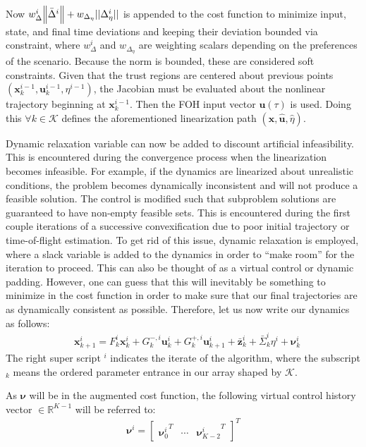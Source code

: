 \documentclass[conf]{new-aiaa}
\begin{document}
Now $w_\Delta^i \norm{{\bar{\Delta}}^i} + w_{\Delta_\eta} ||\Delta_\eta^i ||$ is appended to the cost function to minimize input, state, and final time deviations and keeping their deviation bounded via constraint, where $w_\Delta^i$ and $w_{\Delta_\eta}$ are weighting scalars depending on the preferences of the scenario. Because the norm is bounded, these are considered soft constraints. Given that the trust regions are centered about previous points $(\mathbf{x}_{k}^{i-1},\mathbf{u}_{k}^{i-1},\eta^{i-1})$, the Jacobian must be evaluated about the nonlinear trajectory beginning at $\mathbf{x}_{k}^{i-1}$. Then the FOH input vector $\mathbf{u}(\tau)$ is used. Doing this $\forall k \in \mathcal{K}$ defines the aforementioned linearization path $(\hat{\mathbf{x}}, \hat{\mathbf{u}}, \hat{\eta})$. 


Dynamic relaxation variable can now be added to discount artificial infeasibility. This is encountered during the convergence process when the linearization becomes infeasible. For example, if the dynamics are linearized about unrealistic conditions, the problem becomes dynamically inconsistent and will not produce a feasible solution. The control is modified such that subproblem solutions are guaranteed to have non-empty feasible sets. This is encountered during the first couple iterations of a successive convexification due to poor initial trajectory or time-of-flight estimation. To get rid of this issue, dynamic relaxation is employed, where a slack variable is added to the dynamics in order to ``make room'' for the iteration to proceed. This can also be thought of as a virtual control or dynamic padding. However, one can guess that this will inevitably be something to minimize in the cost function in order to make sure that our final trajectories are as dynamically consistent as possible. Therefore, let us now write our dynamics as follows: 
%
\begin{align}
& \mathbf{x}_{k+1}^i = F_k^i\mathbf{x}_k^i + G^{-,i}_k\mathbf{u}_k^i + G_k^{+,i}\mathbf{u}_{k+1}^i + \bar{\mathbf{z}}^i_k +\bar{\Sigma}_k^i\eta^i + \bm{\nu}_k^i
\end{align}
The right super script $^i$ indicates the iterate of the algorithm, where the subscript $_k$ means the ordered parameter entrance in our array shaped by $\mathcal{K}$.

As $\bm{\nu}$ will be in the augmented cost function, the following virtual control history vector $\in \mathbb{R}^{K-1}$ will be referred to:
\begin{align}
\bm{\nu}^i = 
	\begin{bmatrix}
	{\bm{\nu}_0^i}^T & \cdots & {\bm{\nu}^i_{K-2}}^T 
	\end{bmatrix}^T
\end{align}
\end{document}
